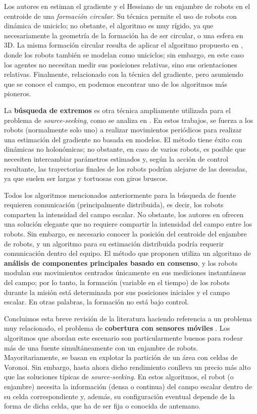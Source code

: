 Los autores en \cite{brinon2015distributed, brinon2019multirobot} estiman el gradiente y el Hessiano de un enjambre de robots en el centroide de una \emph{formación circular}. Su técnica permite el uso de robots con dinámica de uniciclo; no obstante, el algoritmo es muy rígido, ya que necesariamente la geometría de la formación ha de ser circular, o una esfera en 3D. La misma formación circular resulta de aplicar el algoritmo propuesto en \cite{fabbiano2016distributed}, donde los robots también se modelan como uniciclos; sin embargo, en este caso los agentes no necesitan medir sus posiciones relativas, sino sus orientaciones relativas. Finalmente, relacionado con la técnica del gradiente, pero asumiendo que se conoce el campo, en \cite{ogren2004cooperative} podemos encontrar uno de los algoritmos más pioneros.

La \textbf{búsqueda de extremos} es otra técnica ampliamente utilizada para el problema de \textit{source-seeking}, como se analiza en \cite{li2020cooperative,cochran2009nonholonomic}. En estos trabajos, se fuerza a los robots (normalmente solo uno) a realizar movimientos periódicos para realizar una estimación del gradiente no basada en modelos. El método tiene éxito con dinámicas no holonómicas; no obstante, en caso de varios robots, es posible que necesiten intercambiar parámetros estimados y, según la acción de control resultante, las trayectorias finales de los robots podrían alejarse de las deseadas, ya que suelen ser largas y tortuosas con giros bruscos.

Todos los algoritmos mencionados anteriormente para la búsqueda de fuente requieren comunicación (principalmente distribuida), es decir, los robots comparten la intensidad del campo escalar. No obstante, los autores en \cite{al2021distributed} ofrecen una solución elegante que no requiere compartir la intensidad del campo entre los robots. Sin embargo, es necesario conocer la posición del centroide del enjambre de robots, y un algoritmo para su estimación distribuida podría requerir comunicación dentro del equipo. El método que proponen utiliza un algoritmo de \textbf{análisis de componentes principales basado en consenso}, y los robots modulan sus movimientos centrados únicamente en sus mediciones instantáneas del campo; por lo tanto, la formación (variable en el tiempo) de los robots durante la misión está determinada por sus posiciones iniciales y el campo escalar. En otras palabras, la formación no está bajo control.

Concluimos esta breve revisión de la literatura haciendo referencia a un problema muy relacionado, el problema de \textbf{cobertura con sensores móviles} \cite{cortes2004coverage}. Los algoritmos que abordan este escenario son particularmente buenos para rodear más de una fuente simultáneamente con un enjambre de robots. Mayoritariamente, se basan en explotar la partición de un área con celdas de Voronoi. Sin embargo, hasta ahora dicho rendimiento conlleva un precio más alto que las soluciones típicas de \textit{source-seeking}. En estos algoritmos, el robot (o enjambre) necesita la información (densa o continua) del campo escalar dentro de su celda correspondiente y, además, su configuración eventual depende de la forma de dicha celda, que ha de ser fija o conocida de antemano.


